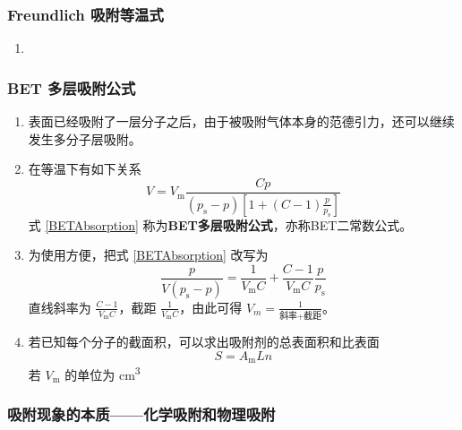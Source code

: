 \subsubsection{Freundlich 吸附等温式}

\begin{enumerate}
    \item 
\end{enumerate}

\subsubsection{BET 多层吸附公式}

\begin{enumerate}
    \item 表面已经吸附了一层分子之后，由于被吸附气体本身的范德引力，还可以继续发生多分子层吸附。
    \item 在等温下有如下关系
    \begin{equation}
        V = V_{\mathrm{m}} \frac{Cp}{(p_{\mathrm{s}} - p)\left[1 + (C - 1) \frac{p}{p_{\mathrm{s}}}\right]} \label{BETAbsorption}
    \end{equation}
    式 \eqref{BETAbsorption} 称为\textbf{BET多层吸附公式}，亦称BET二常数公式。
    \item 为使用方便，把式 \eqref{BETAbsorption} 改写为
    \begin{equation}
        \frac{p}{V(p_{\mathrm{s}} - p)} = \frac1{V_\mathrm{m}C} + \frac{C - 1}{V_\mathrm{m}C} \frac{p}{p_\mathrm{s}}
    \end{equation}
    直线斜率为 $\displaystyle \frac{C - 1}{V_\mathrm{m}C}$，截距 $\displaystyle \frac1{V_\mathrm{m}C}$，由此可得 $\displaystyle V_m = \frac1{\text{斜率} + \text{截距}}$。%
    \item 若已知每个分子的截面积，可以求出吸附剂的总表面积和比表面
    \begin{equation*}
        S = A_{\mathrm{m}}Ln
    \end{equation*}
    若 $V_{\mathrm{m}}$ 的单位为 \si{\centi \meter \cubed}
\end{enumerate}

\subsubsection{吸附现象的本质——化学吸附和物理吸附}